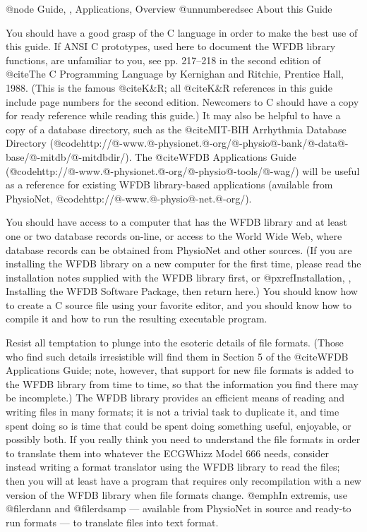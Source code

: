 @node     Guide, , Applications, Overview
@unnumberedsec About this Guide

You should have a good grasp of the C language in order to make the best use of
this guide.  If ANSI C prototypes, used here to document the WFDB library
functions, are unfamiliar to you, see pp. 217--218 in the second edition of
@cite{The C Programming Language} by Kernighan and Ritchie, Prentice Hall,
1988.  (This is the famous @cite{K&R}; all @cite{K&R} references in this guide
include page numbers for the second edition.  Newcomers to C should have a copy
for ready reference while reading this guide.)  It may also be helpful to have
a copy of a database directory, such as the @cite{MIT-BIH Arrhythmia Database
Directory}
(@code{http://@-www.@-physionet.@-org/@-physio@-bank/@-data@-base/@-mitdb/@-mitdbdir/}).
The @cite{WFDB Applications Guide}
(@code{http://@-www.@-physionet.@-org/@-physio@-tools/@-wag/}) will be useful
as a reference for existing WFDB library-based applications (available from
PhysioNet, @code{http://@-www.@-physio@-net.@-org/}).

You should have access to a computer that has the WFDB library and at
least one or two database records on-line, or access to the World Wide Web,
where database records can be obtained from PhysioNet and other sources.  (If
you are installing the WFDB library on a new computer for the first time,
please read the installation notes supplied with the WFDB library first, or
@pxref{Installation, , Installing the WFDB Software Package}, then return
here.)  You should know how to create a C source file using your
favorite editor, and you should know how to compile it and how to run
the resulting executable program.

Resist all temptation to plunge into the esoteric details of file
formats.  (Those who find such details irresistible will find them in
Section 5 of the @cite{WFDB Applications Guide}; note, however, that
support for new file formats is added to the WFDB library from time to
time, so that the information you find there may be incomplete.)  The
WFDB library provides an efficient means of reading and writing files in
many formats; it is not a trivial task to duplicate it, and time spent
doing so is time that could be spent doing something useful, enjoyable,
or possibly both.  If you really think you need to understand the file
formats in order to translate them into whatever the ECGWhizz Model 666
needs, consider instead writing a format translator using the WFDB
library to read the files; then you will at least have a program that
requires only recompilation with a new version of the WFDB library when
file formats change.  @emph{In extremis}, use @file{rdann} and
@file{rdsamp} --- available from PhysioNet in source and ready-to run
formats --- to translate files into text format.

